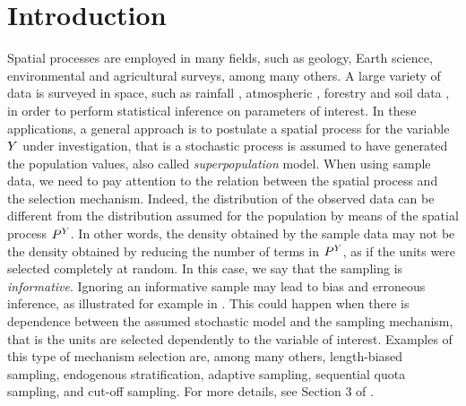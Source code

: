 \section{Introduction} \label{sec:intro}
Spatial processes are employed in many fields, such as geology, Earth science, environmental and agricultural surveys, among many others. A large variety of data is surveyed in space, such as rainfall \citep{ord1979spatial}, atmospheric  \citep{thiebaux1987spatial}, forestry  \citep{samra1989spatial} and soil data \citep{burgess1980optimal}, in order to perform statistical inference on parameters of interest. In these applications, a general approach is to postulate a spatial process for the variable $Y$ under investigation, that is a stochastic process is assumed to have generated the population values, also called \emph{superpopulation} model. %
When using sample data, we need to pay attention to the relation between the spatial process and the  selection mechanism. Indeed, the distribution of the observed data can be different from the distribution assumed for the population by means of the spatial process $P^{Y}$. In other words, the density obtained by the sample data may not be the density obtained by reducing the number of terms in $P^{Y}$, as if the units were selected completely at random. In this case, we say that the sampling is \emph{informative}. Ignoring an informative sample may lead to bias and erroneous inference, as illustrated for example in \cite{skinner1989analysis}. This could happen when there is dependence between the assumed stochastic model and the sampling mechanism, that is the units are selected dependently to the variable of interest. Examples of this type of mechanism selection are, among many others, length-biased sampling, endogenous stratification, adaptive sampling, sequential quota sampling, and cut-off sampling. For more details, see Section 3 of \cite{bonnery2012uniform}.

